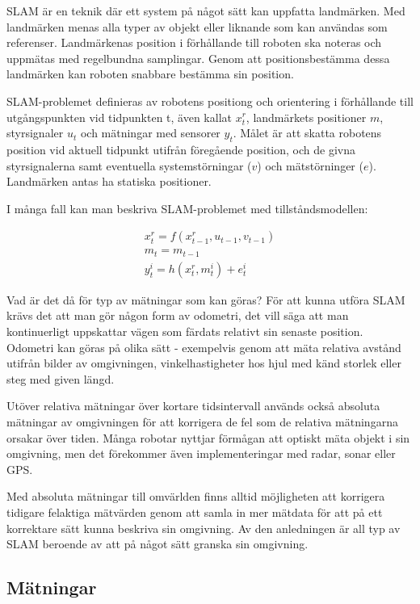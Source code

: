 \documentclass[a4paper,12pt,fleqn]{article}
\begin{document}
SLAM är en teknik där ett system på något sätt kan uppfatta landmärken. Med landmärken menas alla typer av objekt eller liknande som kan användas som referenser. Landmärkenas position i förhållande till roboten ska noteras och uppmätas med regelbundna samplingar. Genom att positionsbestämma dessa landmärken kan roboten snabbare bestämma sin position. 

SLAM-problemet definieras av robotens positiong och orientering i förhållande till utgångspunkten vid tidpunkten t, även kallat $x_{t}^r$, landmärkets positioner $m$, styrsignaler $u_{t}$ och mätningar med sensorer $y_{t}$. Målet är att skatta robotens position vid aktuell tidpunkt utifrån föregående position, och de givna styrsignalerna samt eventuella systemstörningar ($v$) och mätstörninger ($e$). Landmärken antas ha statiska positioner. 

I många fall kan man beskriva SLAM-problemet med tillståndsmodellen:

\begin{gather}
x_{t}^r = f(x_{t-1}^r, u_{t-1}, v_{t-1}) \\
m_{t} = m_{t-1} \\
y_{t}^i = h(x_{t}^r,m_{t}^i) + e_{t}^i
\end{gather}

%
Vad är det då för typ av mätningar som kan göras? För att kunna utföra SLAM krävs det att man gör någon form av odometri, det vill säga att man kontinuerligt uppskattar vägen som färdats relativt sin senaste position. Odometri kan göras på olika sätt - exempelvis genom att mäta relativa avstånd utifrån bilder av omgivningen, vinkelhastigheter hos hjul med känd storlek eller steg med given längd. 

Utöver relativa mätningar över kortare tidsintervall används också absoluta mätningar av omgivningen för att korrigera de fel som de relativa mätningarna orsakar över tiden. Många robotar nyttjar förmågan att optiskt mäta objekt i sin omgivning, men det förekommer även implementeringar med radar, sonar eller GPS. 

Med absoluta mätningar till omvärlden finns alltid möjligheten att korrigera tidigare felaktiga mätvärden genom att samla in mer mätdata för att på ett korrektare sätt kunna beskriva sin omgivning. Av den anledningen är all typ av SLAM beroende av att på något sätt granska sin omgivning. 

\subsection{Mätningar}
\end{document}

